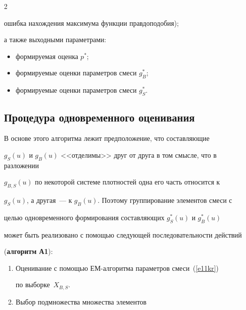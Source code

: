 \begin{multicols}{2}
\begin{itemize}
ошибка нахождения максимума функции правдоподобия);


\end{itemize}


а также выходными параметрами:


\begin{itemize}


\item формируемая оценка $p^*$;


\item формируемые оценки параметров смеси $g_B^*$;


\item формируемые оценки параметров смеси $g_S^*$.


\end{itemize}





\subsection{Процедура одновременного оценивания} %


     


     В основе этого алгоритма лежит предположение, что составляющие 


$g_S(u)$ и $g_B(u)$ <<отделимы>> друг от друга в том смысле, что в разложении 


$g_{B,S}(u)$ по некоторой системе плотностей одна его часть относится к 


$g_S(u)$, а другая~--- к $g_B(u)$. Поэтому группирование элементов смеси с 


целью одновременного формирования составляющих $g_S^*(u)$ и $g_B^*(u)$ 


может быть реализовано с помощью следующей последовательности действий


     (\textbf{алгоритм А1}):





\noindent


\begin{enumerate}[1.]


\item Оценивание с помощью ЕМ-алгоритма па\-ра\-мет\-ров смеси~(\ref{e11kr}) 


по выборке~$X_{B,S}$.


\item Выбор подмножества множества элементов 



\end{enumerate}
\end{multicols}
